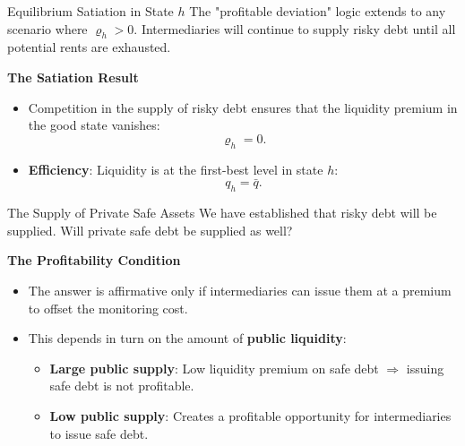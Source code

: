 \documentclass[11pt,aspectratio=169]{beamer}
\begin{document}
\begin{frame}{Equilibrium Satiation in State $h$}
\small
The "profitable deviation" logic extends to any scenario where $\varrho_h > 0$. Intermediaries will continue to supply risky debt until all potential rents are exhausted.

\vspace{0.3cm}
\textbf{The Satiation Result}
\begin{itemize}
    \item Competition in the supply of risky debt ensures that the liquidity premium in the good state vanishes:
    \begin{equation}
    \varrho_h = 0.
    \end{equation}
    \item \textbf{Efficiency}: Liquidity is at the first-best level in state $h$:
    \begin{equation}
    q_h = \bar{q}.
    \end{equation}
\end{itemize}
\end{frame}%
\begin{frame}{The Supply of Private Safe Assets}
\small
We have established that risky debt will be supplied. Will private safe debt be
supplied as well? 

\vspace{0.3cm}
\textbf{The Profitability Condition}
\begin{itemize}
    \item The answer is affirmative only if intermediaries can issue them at a premium to offset the monitoring cost.
    \item This depends in turn on the amount of \textbf{public liquidity}:
    \begin{itemize}
        \item \textbf{Large public supply}: Low liquidity premium on safe debt $\Rightarrow$ issuing safe debt is not profitable.
        \item \textbf{Low public supply}: Creates a profitable opportunity for intermediaries to issue safe debt.
    \end{itemize}
\end{itemize}
\end{frame}
\end{document}
